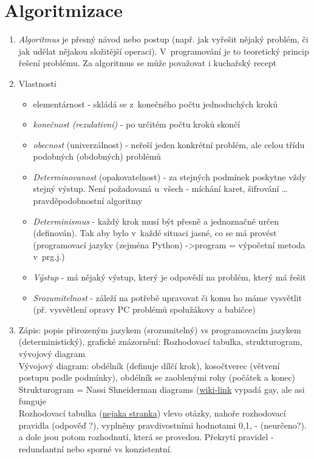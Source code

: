 \documentclass[12pt]{article}
\begin{document}
\section{Algoritmizace}
\begin{enumerate}
\item \emph{Algoritmus} je přesný návod nebo postup (např. jak vyřešit nějaký problém, či jak udělat nějakou složitější operaci). V~programování je to teoretický princip řešení problému. Za algoritmus se může považovat i kuchařský recept
\item Vlastnosti
\begin{itemize}
\item elementárnost - skládá se z~konečného počtu jednoduchých kroků
\item \emph{konečnost (rezulativní)} - po určitém počtu kroků skončí
\item \emph{obecnost} (univerzálnost) - neřeší jeden konkrétní problém, ale celou třídu podobných (obdobných) problémů
\item \emph{Determinovanost} (opakovatelnost) - za stejných podmínek poskytne vždy stejný výstup. Není požadovaná u~všech - míchání karet, šifrování \dots pravděpodobnostní algoritmy
\item \emph{Determinismus} - každý krok musí být přesně a jednoznačně určen (definován). Tak aby bylo v~každé situaci jasné, co se má provést (programovací jazyky (zejména Python) ->program = výpočetní metoda v~prg.j.)
\item \emph{Výstup} - má nějaký výstup, který je odpovědí na problém, který má řešit
\item \emph{Srozumitelnost} - záleží na potřebě upravovat či komu ho máme vysvětlit (př. vysvětlení opravy PC problémů spolužákovy a babičce)
\end{itemize}
\item Zápis: popis přirozeným jazykem (srozumitelný) vs programovacím jazykem (deterministický), grafické znázornění: Rozhodovací tabulka, strukturogram, vývojový diagram\\
Vývojový diagram: obdélník (definuje dílčí krok), kosočtverec (větvení postupu podle podmínky), obdélník se zaoblenými rohy (počátek a konec)\\
Strukturogram = Nassi Shneiderman diagrams (\href{https://en.wikipedia.org/wiki/Nassi\%E2\%80\%93Shneiderman_diagram}{wiki-link} vypadá gay, ale asi funguje\\
Rozhodovací tabulka (\href{https://wikisofia.cz/wiki/Rozhodovac\%C3\%AD_tabulky_a_stromy}{nejaka stranka}) vlevo otázky, nahoře rozhodovací pravidla (odpověď ?), vyplněny pravdivostními hodnotami 0,1, - (neurčeno?). a dole jsou potom rozhodnutí, která se provedou. Překrytí pravidel - redundantní nebo sporné vs konzistentní.

\end{enumerate}
\end{document}
